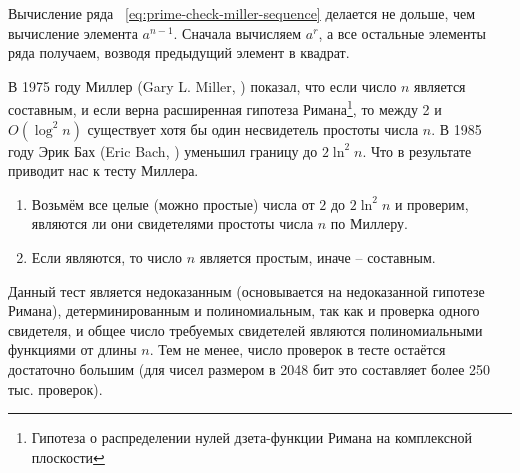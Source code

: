 Вычисление ряда ~\ref{eq:prime-check-miller-sequence} делается не дольше, чем вычисление элемента $a^{n-1}$. Сначала вычисляем $a^{r}$, а все остальные элементы ряда получаем, возводя предыдущий элемент в квадрат.

В 1975 году Миллер (Gary L. Miller, \cite{Miller:1975, Miller:1976}) показал, что если число $n$ является составным, и если верна расширенная гипотеза Римана\footnote{Гипотеза о распределении нулей дзета-функции Римана на комплексной плоскости}, то между 2 и $O \left( \log^2 n \right)$ существует хотя бы один несвидетель простоты числа $n$. В 1985 году Эрик Бах (Eric Bach, \cite{Bach:1990}) уменьшил границу до $2 \ln^2 n$. Что в результате приводит нас к тесту Миллера.

\begin{enumerate}
	\item Возьмём все целые (можно простые) числа от $2$ до $2 \ln^2 n $ и проверим, являются ли они свидетелями простоты числа $n$ по Миллеру.
	\item Если являются, то число $n$ является простым, иначе -- составным.
\end{enumerate}

Данный тест является недоказанным (основывается на недоказанной гипотезе Римана), детерминированным и полиномиальным, так как и проверка одного свидетеля, и общее число требуемых свидетелей являются полиномиальными функциями от длины $n$. Тем не менее, число проверок в тесте остаётся достаточно большим (для чисел размером в 2048 бит это составляет более 250 тыс. проверок).

